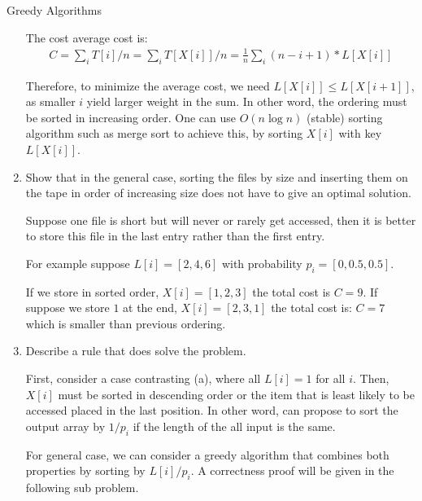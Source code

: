 \documentclass{article}
\numberwithin{table}{section}
\numberwithin{figure}{section}
\begin{document}
\begin{section}{Greedy Algorithms}
\begin{enumerate}
\begin{tcolorbox}
    The cost average cost is:
    \begin{align*}
        C = \sum_i T[i]/n = \sum_i T[X[i]]/n = \frac{1}{n} \sum_{i} (n-i+1) * L[X[i]]
    \end{align*}
    
    Therefore, to minimize the average cost, we need $L[X[i]] \leq L[X[i+1]]$, as smaller $i$ yield larger weight in the sum. In other word, the ordering must be sorted in increasing order. One can use $O(n \log n)$ (stable) sorting algorithm such as merge sort to achieve this, by sorting $X[i]$ with key $L[X[i]]$.
    \end{tcolorbox}
    
    \item Show that in the general case, sorting the files by size and inserting them on the tape in order of increasing size does not have to give an optimal solution.
    
    \begin{tcolorbox}
    Suppose one file is short but will never or rarely get accessed, then it is better to store this file in the last entry rather than the first entry. 
    
    For example suppose $L[i] = [2, 4, 6]$ with probability $p_i = [0, 0.5, 0.5]$.
    
    If we store in sorted order, $X[i] = [1, 2, 3]$ the total cost is $C = 9$. If suppose we store $1$ at the end, $X[i] = [2, 3, 1]$ the total cost is: $C = 7$ which is smaller than previous ordering.  
    \end{tcolorbox}
    
    \item Describe a rule that does solve the problem.
    \begin{tcolorbox}
    First, consider a case contrasting (a), where all $L[i] = 1$ for all $i$. Then, $X[i]$ must be sorted in descending order or the item that is least likely to be accessed placed in the last position. In other word, can propose to sort the output array by $1/p_i$ if the length of the all input is the same. 
    
    For general case, we can consider a greedy algorithm that combines both properties by sorting by $L[i]/p_i$. A correctness proof will be given in the following sub problem.
    \end{tcolorbox}
    

\end{enumerate}
\end{section}
\end{document}
